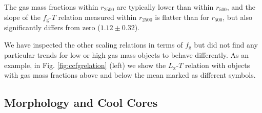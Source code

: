 \documentclass[structabstract]{aa}
\begin{document}
The gas mass fractions within $r_{2500}$ are typically lower than
within $r_{500}$, and the slope of the $f_{\text{g}}$-$T$ relation
measured within $r_{2500}$ is flatter than for $r_{500}$, but also
significantly differs from zero ($1.12\pm0.32$).

We have inspected the other scaling relations in terms of
  $f_{\text{g}}$ but did not find any particular trends for low or
  high gas mass objects to behave differently. As an example, in
  Fig. \ref{fig:ccfgrelation} (left) we show the $L_{\text{x}}$-$T$
  relation with objects with gas mass fractions above and below the
  mean marked as different symbols.
%
\subsection{Morphology and Cool Cores}\label{sec:compmorph}
\end{document}
